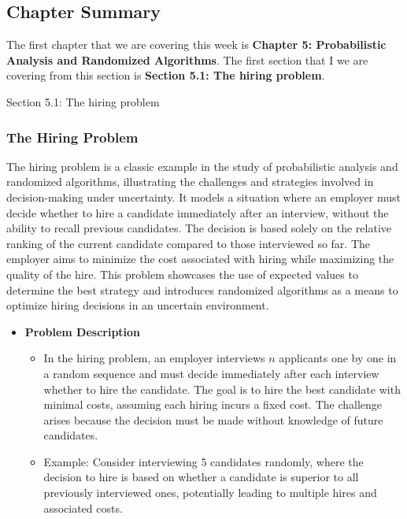 \newpage

\subsection{Chapter Summary}

The first chapter that we are covering this week is \textbf{Chapter 5: Probabilistic Analysis and Randomized Algorithms}. The first section that I we are covering from this section is \textbf{Section 5.1: The hiring problem}.

\begin{notes}{Section 5.1: The hiring problem}
    \subsubsection*{The Hiring Problem}

    The hiring problem is a classic example in the study of probabilistic analysis and randomized algorithms, illustrating the challenges and strategies involved in decision-making under uncertainty. 
    It models a situation where an employer must decide whether to hire a candidate immediately after an interview, without the ability to recall previous candidates. The decision is based solely on 
    the relative ranking of the current candidate compared to those interviewed so far. The employer aims to minimize the cost associated with hiring while maximizing the quality of the hire. This 
    problem showcases the use of expected values to determine the best strategy and introduces randomized algorithms as a means to optimize hiring decisions in an uncertain environment.
    
    \begin{itemize}
        \item \textbf{Problem Description}
        \begin{itemize}
            \item In the hiring problem, an employer interviews $n$ applicants one by one in a random sequence and must decide immediately after each interview whether to hire the candidate. The 
            goal is to hire the best candidate with minimal costs, assuming each hiring incurs a fixed cost. The challenge arises because the decision must be made without knowledge of future candidates.
            \item Example: Consider interviewing 5 candidates randomly, where the decision to hire is based on whether a candidate is superior to all previously interviewed ones, potentially 
            leading to multiple hires and associated costs.
        \end{itemize}
        

\end{itemize}
\end{notes}
